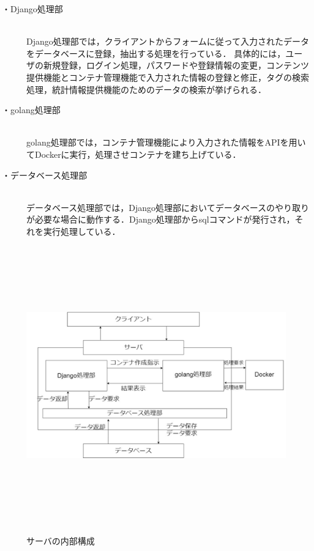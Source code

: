\begin{description}
    \item[・Django処理部]\mbox{}\\
        Django処理部では，クライアントからフォームに従って入力されたデータをデータベースに登録，抽出する処理を行っている．
        具体的には，ユーザの新規登録，ログイン処理，パスワードや登録情報の変更，コンテンツ提供機能とコンテナ管理機能で入力された情報の登録と修正，タグの検索処理，統計情報提供機能のためのデータの検索が挙げられる．
    \item[・golang処理部]\mbox{}\\
        golang処理部では，コンテナ管理機能により入力された情報をAPIを用いてDockerに実行，処理させコンテナを建ち上げている．
    \item[・データベース処理部]\mbox{}\\
        データベース処理部では，Django処理部においてデータベースのやり取りが必要な場合に動作する．Django処理部からsqlコマンドが発行され，それを実行処理している．
\end{description}

\begin{figure}[htbp]
    \begin{center}
        \includegraphics[width=13cm,height=12cm,keepaspectratio]{server_arch-crop.pdf}\\
    \end{center}
    \caption{サーバの内部構成}
    \label{server_naibu}
\end{figure}

